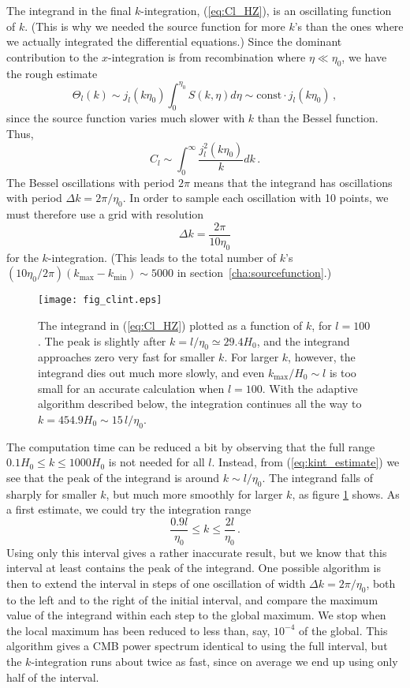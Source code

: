 \documentclass[twocolumn,nofootinbib,amsmath,amssymb]{revtex4}
\newcommand{\be}{\begin{equation}}
\newcommand{\ee}{\end{equation}}
\newcommand{\const}{\mathrm{const}}
\begin{document}
The integrand in the final $k$-integration, (\ref{eq:Cl_HZ}), is an oscillating
function of $k$. (This is why we needed the source function for more $k$'s than
the ones where we actually integrated the differential equations.) Since the
dominant contribution to the $x$-integration is from recombination where $\eta
\ll \eta_0$, we have the rough estimate
\be
  \Theta_l(k) \sim j_l(k\eta_0) \int_0^{\eta_0} S(k,\eta) d\eta \sim
    \const \cdot j_l(k\eta_0) \, ,
\ee
since the source function varies much slower with $k$ than the Bessel function.
Thus,
\be
  C_l \sim \int_0^\infty \frac{j_l^2(k\eta_0)}{k} dk \, .
  \label{eq:kint_estimate}
\ee
The Bessel oscillations with period $2\pi$ means that the integrand has
oscillations with period $\Delta k = 2\pi / \eta_0$. In order to sample each
oscillation with 10 points, we must therefore use a grid with resolution
\be
  \Delta k = \frac{2\pi}{10 \eta_0}
\ee
for the $k$-integration. (This leads to the total number of $k$'s
$(10\eta_0/2\pi) (k_{\max}-k_{\min}) \sim 5000$ in
section~\ref{cha:sourcefunction}.)

\begin{figure}[!h]
  \begin{center}
    \texttt{[image: fig\_clint.eps]}
  \end{center}
  \vspace{-6mm}
  \caption{The integrand in (\ref{eq:Cl_HZ}) plotted as a function of $k$, for
  $l = 100$. The peak is slightly after $k = l/\eta_0 \simeq 29.4 H_0$, and the
  integrand approaches zero very fast for smaller $k$. For larger $k$, however,
  the integrand dies out much more slowly, and even $k_{\max}/H_0 \sim l$ is
  too small for an accurate calculation when $l = 100$. With the adaptive
  algorithm described below, the integration continues all the way to $k =
  454.9 H_0 \sim 15 \, l / \eta_0$.}
  \label{fig:kintegration}
\end{figure}

The computation time can be reduced a bit by observing that the full range $0.1
H_0 \leq k \leq 1000 H_0$ is not needed for all $l$. Instead, from
(\ref{eq:kint_estimate}) we see that the peak of the integrand is around $k
\sim l/\eta_0$. The integrand falls of sharply for smaller $k$, but much more
smoothly for larger $k$, as figure \ref{fig:kintegration} shows. As a first
estimate, we could try the integration range
\be
  \frac{0.9 l}{\eta_0} \leq k \leq \frac{2 l}{\eta_0} \, .
\ee
Using only this interval gives a rather inaccurate result, but we know that
this interval at least contains the peak of the integrand. One possible
algorithm is then to extend the interval in steps of one oscillation of width
$\Delta k = 2\pi/\eta_0$, both to the left and to the right of the initial
interval, and compare the maximum value of the integrand within each step to
the global maximum. We stop when the local maximum has been reduced to less
than, say, $10^{-4}$ of the global. This algorithm gives a CMB power spectrum
identical to using the full interval, but the $k$-integration runs about twice
as fast, since on average we end up using only half of the interval.
\end{document}
